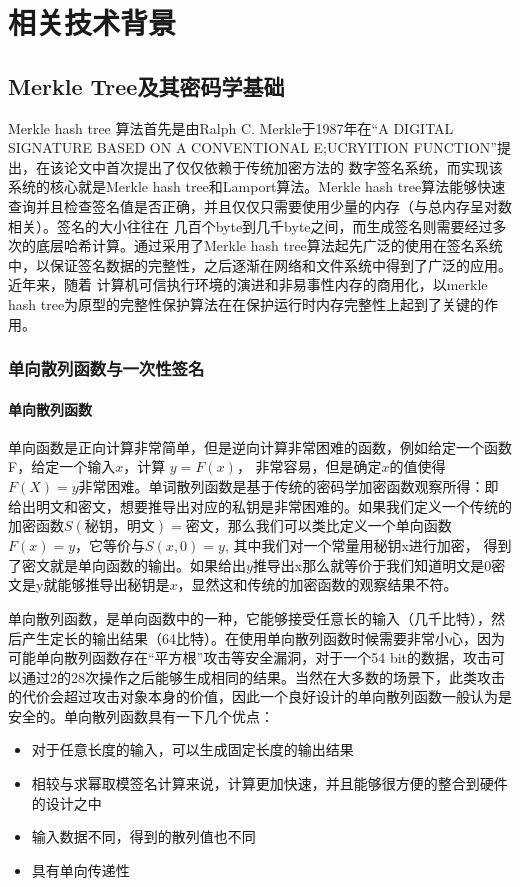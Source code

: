 
\chapter{相关技术背景}

\section{Merkle Tree及其密码学基础}
Merkle hash tree \cite{merkle1987digital}算法首先是由Ralph C. Merkle于1987年在“A DIGITAL SIGNATURE BASED ON A CONVENTIONAL E;UCRYITION FUNCTION”提出，在该论文中首次提出了仅仅依赖于传统加密方法的
数字签名系统，而实现该系统的核心就是Merkle hash tree和Lamport算法。Merkle hash tree算法能够快速查询并且检查签名值是否正确，并且仅仅只需要使用少量的内存（与总内存呈对数相关）。签名的大小往往在
几百个byte到几千byte之间，而生成签名则需要经过多次的底层哈希计算。通过采用了Merkle hash tree算法起先广泛的使用在签名系统中，以保证签名数据的完整性，之后逐渐在网络和文件系统中得到了广泛的应用。近年来，随着
计算机可信执行环境的演进和非易事性内存的商用化，以merkle hash tree为原型的完整性保护算法在在保护运行时内存完整性上起到了关键的作用。

\subsection{单向散列函数与一次性签名}
\subsubsection{单向散列函数}
单向函数是正向计算非常简单，但是逆向计算非常困难的函数，例如给定一个函数F，给定一个输入$x$，计算 $y=F(x)$， 非常容易，但是确定$x$的值使得$F(X)=y$非常困难。单词散列函数是基于传统的密码学加密函数观察所得：即
给出明文和密文，想要推导出对应的私钥是非常困难的。如果我们定义一个传统的加密函数$S(秘钥，明文) = 密文$，那么我们可以类比定义一个单向函数$F(x) = y$，它等价与$S(x,0) = y$, 其中我们对一个常量用秘钥x进行加密，
得到了密文就是单向函数的输出。如果给出$y$推导出x那么就等价于我们知道明文是0密文是y就能够推导出秘钥是$x$，显然这和传统的加密函数的观察结果不符。

单向散列函数，是单向函数中的一种，它能够接受任意长的输入（几千比特），然后产生定长的输出结果（64比特）。在使用单向散列函数时候需要非常小心，因为可能单向散列函数存在“平方根”攻击等安全漏洞，对于一个54
bit的数据，攻击可以通过2的28次操作之后能够生成相同的结果。当然在大多数的场景下，此类攻击的代价会超过攻击对象本身的价值，因此一个良好设计的单向散列函数一般认为是安全的。单向散列函数具有一下几个优点：
\begin{itemize}
    \item 对于任意长度的输入，可以生成固定长度的输出结果
    \item 相较与求幂取模签名计算来说，计算更加快速，并且能够很方便的整合到硬件的设计之中
    \item 输入数据不同，得到的散列值也不同
    \item 具有单向传递性
\end{itemize}

